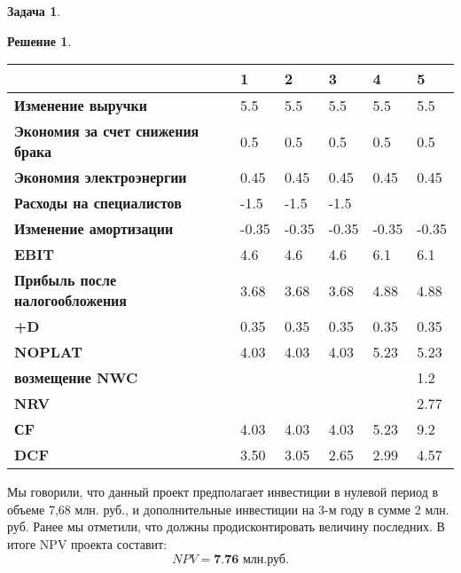 \documentclass[a4paper, 14pt]{article}
\theoremstyle{plain} %
\theoremstyle{definition} %
\newtheorem*{solution}{Решение}
\newtheorem{problem}{Задача}[subsection]
\theoremstyle{remark} %
\begin{document}
\begin{problem}
\begin{solution}
			\begin{table}
			\centering
			\begin{tabular}{|l|l|l|l|l|l|}
			\hline
			                                         & \textbf{1} & \textbf{2} & \textbf{3} & \textbf{4} & \textbf{5}  \\
			\hline
			 \textbf{Изменение выручки}              & 5.5        & 5.5        & 5.5        & 5.5        & 5.5         \\
			\hline
			\textbf{Экономия за счет снижения брака} & 0.5        & 0.5        & 0.5        & 0.5        & 0.5         \\
			\hline
			\textbf{Экономия электроэнергии}         & 0.45       & 0.45       & 0.45       & 0.45       & 0.45        \\
			\hline
			\textbf{Расходы на специалистов}         & -1.5       & -1.5       & -1.5       &            &             \\
			\hline
			\textbf{Изменение амортизации}           & -0.35      & -0.35      & -0.35      & -0.35      & -0.35       \\
			\hline
			\textbf{EBIT}                            & 4.6        & 4.6        & 4.6        & 6.1        & 6.1         \\
			\hline
			\textbf{Прибыль после налогообложения}   & 3.68       & 3.68       & 3.68       & 4.88       & 4.88        \\
			\hline
			\textbf{+D}                              & 0.35       & 0.35       & 0.35       & 0.35       & 0.35        \\
			\hline
			\textbf{NOPLAT}                          & 4.03       & 4.03       & 4.03       & 5.23       & 5.23        \\
			\hline
			\textbf{возмещение NWC}                  &            &            &            &            & 1.2         \\
			\hline
			\textbf{NRV}                             &            &            &            &            & 2.77        \\
			\hline
			\textbf{СF}                              & 4.03       & 4.03       & 4.03       & 5.23       & 9.2         \\
			\hline
			\textbf{DCF}                             & 3.50       & 3.05       & 2.65       & 2.99       & 4.57        \\
			\hline
			\end{tabular}
			\end{table}
	Мы говорили, что данный проект предполагает инвестиции в нулевой период в объеме 7,68 млн. руб., и дополнительные инвестиции на 3-м году в сумме 2 млн. руб. Ранее мы отметили, что должны продисконтировать величину последних. В итоге NPV проекта составит:
	\[
		NPV = \textbf{7.76 млн.руб.}
	\]
    \end{solution}
\end{problem}
\newpage
\end{document}
